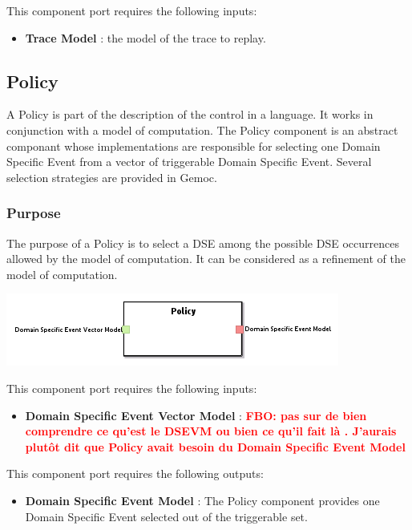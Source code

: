 \documentclass{gemoc} %
\begin{document}
This component port requires the following inputs:
\begin{itemize}
  \item \textbf{Trace Model} :
the model of the trace to replay.
\end{itemize}


\subsection{Policy}
A Policy is part of the description of the control in a language. It works in conjunction with a model of computation.
The Policy component is an abstract componant whose implementations are responsible for selecting one Domain Specific Event from a vector of triggerable Domain Specific Event. Several selection strategies are provided in Gemoc.

\subsubsection{Purpose}
The purpose of a Policy is to select a DSE among the possible DSE occurrences allowed by the model of computation. It can be considered as a refinement of the model of computation.
\begin{center}
\includegraphics*[trim=0.0cm 0.0cm 0cm 0.0cm, clip=true]{../images/generated/Generated_Policy.png}
\end{center}

This component port requires the following inputs:
\begin{itemize}
  \item \textbf{Domain Specific Event Vector Model} :
\textbf{\textcolor{red}{FBO: pas sur de bien comprendre ce qu'est le DSEVM ou bien ce qu'il fait là . J'aurais plutôt dit que Policy avait besoin du Domain Specific Event Model}}
\end{itemize}

This component port requires the following outputs:
\begin{itemize}
  \item \textbf{Domain Specific Event Model} :
The Policy component provides one Domain Specific Event selected out of the triggerable set.
\end{itemize}
\end{document}
